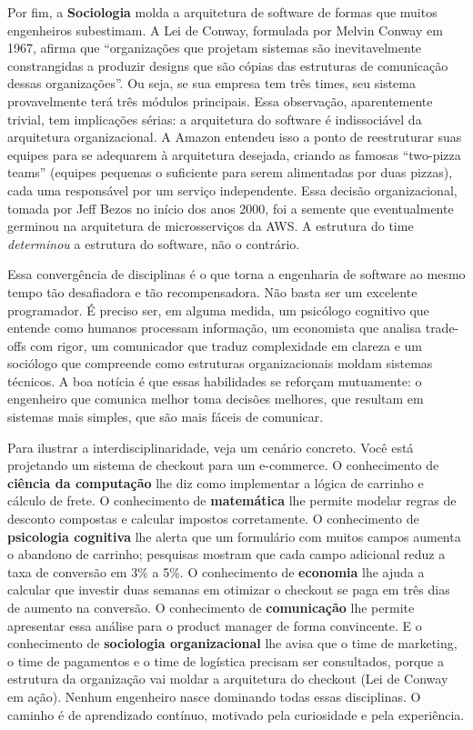 Por fim, a \textbf{Sociologia} molda a arquitetura de software de formas
que muitos engenheiros subestimam. A Lei de Conway, formulada por Melvin
Conway em 1967, afirma que ``organizações que projetam sistemas são
inevitavelmente constrangidas a produzir designs que são cópias das
estruturas de comunicação dessas organizações''. Ou seja, se
sua empresa tem três times, seu sistema provavelmente terá três módulos
principais. Essa observação, aparentemente trivial, tem implicações
sérias: a arquitetura do software é indissociável da arquitetura
organizacional. A Amazon entendeu isso a ponto de reestruturar suas
equipes para se adequarem à arquitetura desejada, criando as famosas
``two-pizza teams'' (equipes pequenas o suficiente para serem
alimentadas por duas pizzas), cada uma responsável por um serviço
independente. Essa decisão organizacional, tomada por Jeff Bezos no início
dos anos 2000, foi a semente que eventualmente germinou na arquitetura de
microsserviços da AWS. A estrutura do time \emph{determinou} a estrutura
do software, não o contrário.

Essa convergência de disciplinas é o que torna a engenharia de software
ao mesmo tempo tão desafiadora e tão recompensadora. Não basta ser um
excelente programador. É preciso ser, em alguma medida, um psicólogo
cognitivo que entende como humanos processam informação, um economista
que analisa trade-offs com rigor, um comunicador que traduz complexidade
em clareza e um sociólogo que compreende como estruturas organizacionais
moldam sistemas técnicos. A boa notícia é que essas habilidades se
reforçam mutuamente: o engenheiro que comunica melhor toma decisões
melhores, que resultam em sistemas mais simples, que são mais fáceis
de comunicar.

Para ilustrar a interdisciplinaridade, veja um cenário concreto. Você
está projetando um sistema de checkout para um e-commerce.
O conhecimento de \textbf{ciência da computação} lhe diz como implementar
a lógica de carrinho e cálculo de frete. O conhecimento de
\textbf{matemática} lhe permite modelar regras de desconto compostas e
calcular impostos corretamente. O conhecimento de \textbf{psicologia
cognitiva} lhe alerta que um formulário com muitos campos aumenta o
abandono de carrinho; pesquisas mostram que cada campo adicional
reduz a taxa de conversão em 3\% a 5\%. O conhecimento de
\textbf{economia} lhe ajuda a calcular que investir duas semanas em
otimizar o checkout se paga em três dias de aumento na conversão. O
conhecimento de \textbf{comunicação} lhe permite apresentar essa análise
para o product manager de forma convincente. E o conhecimento de
\textbf{sociologia organizacional} lhe avisa que o time de marketing,
o time de pagamentos e o time de logística precisam ser consultados,
porque a estrutura da organização vai moldar a arquitetura do checkout
(Lei de Conway em ação). Nenhum engenheiro nasce dominando todas essas
disciplinas. O caminho é de aprendizado contínuo, motivado pela
curiosidade e pela experiência.

